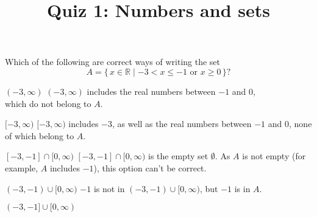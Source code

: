 \documentclass[hidesidemenu]{webquiz}
\title{Quiz 1: Numbers and sets}
\newcommand{\R}{\mathbb R}
\begin{document}
%
%
%


\begin{question}
Which of the following are correct ways of writing the set
\[ A=\{\,x \in {\mathbb R}\mid  -3 < x \leq -1 \text{ or } x\geq 0\,\} \text{?}\]
\begin{choice}
\incorrect $(-3,\infty)$
\response $(-3,\infty)$ includes the real numbers between $-1$ and $0$, \\
which do
not belong to $A$.

\incorrect $[-3,\infty)$
\response $[-3,\infty)$ includes $-3$, as well as
the real numbers between $-1$ and $0$, none of which
 belong to $A$.

\incorrect $[-3,-1]\cap[0,\infty)$
\response $[-3,-1]\cap[0,\infty)$ is the empty set $\emptyset$. As $A$ is not empty (for example, $A$ includes $-1$), this option can't be correct.

\incorrect $(-3,-1)\cup[0,\infty)$
\response $-1$ is not in $(-3,-1)\cup[0,\infty)$, but $-1$ is in $A$.

\correct $(-3,-1]\cup[0,\infty)$

\end{choice}
\end{question}
\end{document}
